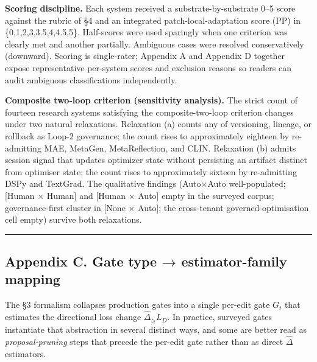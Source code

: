 \textbf{Scoring discipline.} Each system received a
substrate-by-substrate 0--5 score against the rubric of §4 and an
integrated patch-local-adaptation score (PP) in \{0,1,2,3,3.5,4,4.5,5\}.
Half-scores were used sparingly when one criterion was clearly met and
another partially. Ambiguous cases were resolved conservatively
(downward). Scoring is single-rater; Appendix A and Appendix D together
expose representative per-system scores and exclusion reasons so readers
can audit ambiguous classifications independently.

\textbf{Composite two-loop criterion (sensitivity analysis).} The strict
count of fourteen research systems satisfying the composite-two-loop
criterion changes under two natural relaxations. Relaxation (a) counts
any of versioning, lineage, or rollback as Loop-2 governance; the count
rises to approximately eighteen by re-admitting MAE, MetaGen,
MetaReflection, and CLIN. Relaxation (b) admits session signal that
updates optimizer state without persisting an artifact distinct from
optimiser state; the count rises to approximately sixteen by
re-admitting DSPy and TextGrad. The qualitative findings (Auto×Auto
well-populated; {[}Human × Human{]} and {[}Human × Auto{]} empty in the
surveyed corpus; governance-first cluster in {[}None × Auto{]}; the
cross-tenant governed-optimisation cell empty) survive both relaxations.

\begin{center}\rule{0.5\linewidth}{0.5pt}\end{center}

\subsection{Appendix C. Gate type → estimator-family
mapping}\label{appendix-c.-gate-type-estimator-family-mapping}

The §3 formalism collapses production gates into a single per-edit gate
\(G_t\) that estimates the directional loss change
\(\widehat{\Delta}_{z_t} L_D\). In practice, surveyed gates instantiate
that abstraction in several distinct ways, and some are better read as
\emph{proposal-pruning} steps that precede the per-edit gate rather than
as direct \(\widehat{\Delta}\) estimators.

